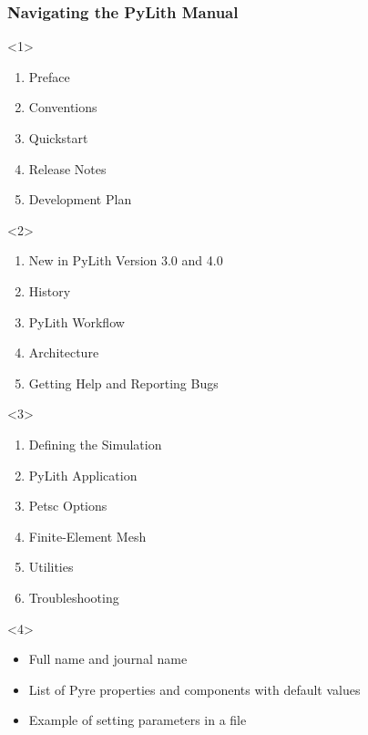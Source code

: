 \documentclass[aspectratio=169]{beamer}
\begin{document}
\begin{frame}[t]
  \frametitle{Navigating the PyLith Manual}
  \summary{}

  \begin{itemize}
    \begin{onlyenv}<1>
      \begin{enumerate}
      \item Preface
      \item Conventions
      \item Quickstart
      \item Release Notes
      \item Development Plan
      \end{enumerate}
    \end{onlyenv}
    \begin{onlyenv}<2>
      \begin{enumerate}
      \item New in PyLith Version 3.0 and 4.0
      \item History
      \item PyLith Workflow
      \item Architecture
      \item Getting Help and Reporting Bugs
      \end{enumerate}
    \end{onlyenv}
    \begin{onlyenv}<3>
      \begin{enumerate}
      \item Defining the Simulation
      \item PyLith Application
      \item Petsc Options
      \item Finite-Element Mesh
      \item Utilities
      \item Troubleshooting
      \end{enumerate}
    \end{onlyenv}
    \begin{onlyenv}<4>
      \begin{itemize}
      \item Full name and journal name
      \item List of Pyre properties and components with default values
      \item Example of setting parameters in a  file

\end{itemize}
\end{onlyenv}
\end{itemize}
\end{frame}
\end{document}
